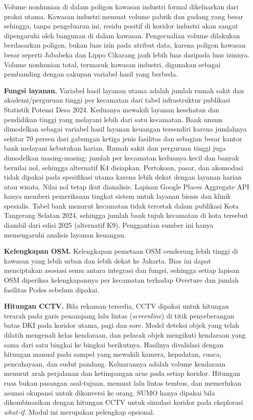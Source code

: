 \documentclass[12pt,a4paper,oneside,openany,indonesian]{report}
\begin{document}
Volume nonhunian di dalam poligon kawasan industri formal dikeluarkan
dari proksi utama. Kawasan industri memuat volume pabrik dan gudang yang
besar sehingga, tanpa pengeluaran ini, residu positif di koridor
industri akan sangat dipengaruhi oleh bangunan di dalam kawasan.
Pengecualian volume dilakukan berdasarkan poligon,
bukan luas izin pada atribut data, karena poligon kawasan besar seperti
Jababeka dan Lippo Cikarang jauh lebih luas daripada luas izinnya.
Volume nonhunian total, termasuk kawasan industri, digunakan sebagai
pembanding dengan cakupan variabel hasil yang berbeda.

\textbf{Fungsi layanan.} Variabel hasil layanan utama adalah jumlah
rumah sakit dan akademi/perguruan tinggi per kecamatan dari tabel infrastruktur
publikasi Statistik Potensi Desa 2024. Keduanya mewakili layanan
kesehatan dan pendidikan tinggi yang melayani lebih dari satu kecamatan.
Bank umum dimodelkan sebagai variabel hasil layanan keuangan tersendiri karena
jumlahnya sekitar 70 persen dari gabungan ketiga jenis fasilitas dan
sebagian besar kantor bank melayani kebutuhan harian. Rumah sakit dan
perguruan tinggi juga dimodelkan masing-masing; jumlah per kecamatan
keduanya kecil dan banyak bernilai nol, sehingga alternatif K4 disiapkan.
Pertokoan, pasar, dan akomodasi tidak dipakai pada spesifikasi utama
karena lebih dekat dengan layanan harian atau wisata. Nilai nol tetap
ikut dianalisis. Lapisan Google Places Aggregate API hanya memberi
pemeriksaan tingkat sistem untuk layanan bisnis dan klinik spesialis.
Tabel bank menurut kecamatan tidak tercetak dalam publikasi Kota
Tangerang Selatan 2024, sehingga jumlah bank tujuh kecamatan di kota
tersebut diambil dari edisi 2025 (alternatif K9). Penggantian sumber ini
hanya memengaruhi analisis layanan keuangan.

\textbf{Kelengkapan OSM.} Kelengkapan pemetaan OSM cenderung lebih tinggi
di kawasan yang lebih urban dan lebih dekat ke Jakarta. Bias ini dapat
menciptakan asosiasi semu antara integrasi dan fungsi, sehingga setiap lapisan OSM diperiksa kelengkapannya per kecamatan terhadap
Overture dan jumlah fasilitas Podes sebelum dipakai.

\textbf{Hitungan CCTV.} Bila rekaman tersedia, CCTV dipakai untuk
hitungan terarah pada garis penampang lalu lintas (\emph{screenline})
di titik penyeberangan batas DKI pada koridor
utama, pagi dan sore. Model deteksi objek yang telah dilatih mengenali
kelas kendaraan, dan pelacak objek mengikuti kendaraan yang sama dari
satu bingkai ke bingkai berikutnya.
Hasilnya divalidasi dengan hitungan manual pada sampel yang mewakili
kamera, kepadatan, cuaca, pencahayaan, dan sudut pandang. Keluarannya
adalah volume kendaraan menurut arah perjalanan dan ketimpangan arus
pada setiap koridor. Hitungan ruas bukan
pasangan asal-tujuan, memuat lalu lintas tembus, dan memerlukan asumsi
okupansi untuk dikonversi ke orang. SUMO hanya dipakai bila
dikombinasikan dengan hitungan CCTV untuk simulasi koridor pada
eksplorasi \emph{what-if}. Modul ini merupakan pelengkap opsional.
\end{document}
